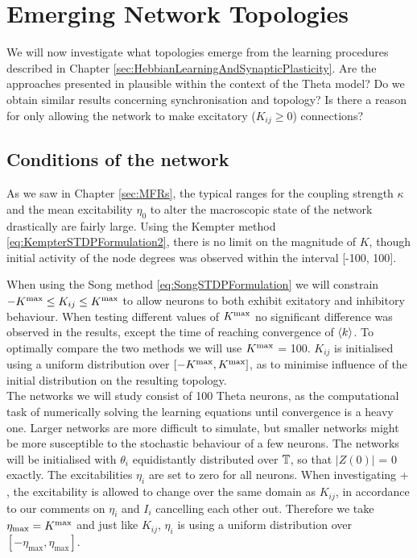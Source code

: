 \newpage
\section{\mywork Emerging Network Topologies}

We will now investigate what topologies emerge from the learning procedures described in Chapter \ref{sec:HebbianLearningAndSynapticPlasticity}. Are the approaches presented in \cite{Kempter1999, Song2000, Song2017, ChrolCannon2012} plausible within the context of the Theta model? Do we obtain similar results concerning synchronisation and topology? Is there a reason for only allowing the network to make excitatory ($K_{ij} \geq 0$) connections? 

\subsection{Conditions of the network}
As we saw in Chapter \ref{sec:MFRs}, the typical ranges for the coupling strength $\kappa$ and the mean excitability $\eta_0$ to alter the macroscopic state of the network drastically are fairly large. Using the Kempter method \eqref{eq:KempterSTDPFormulation2}, there is no limit on the magnitude of $K$, though initial activity of the node degrees was observed within the interval [-100, 100]. 

When using the Song method \eqref{eq:SongSTDPFormulation} we will constrain $-K^{\rm max} \leq K_{ij} \leq K^{\rm max}$ to allow neurons to both exhibit exitatory and inhibitory behaviour. When testing different values of $K^{\rm max}$ no significant difference was observed in the results, except the time of reaching convergence of ${\langle k\rangle}$. To optimally compare the two methods we will use $K^{\rm max}$ = 100. $K_{ij}$ is initialised using a uniform distribution over $[-K^{\rm max}, K^{\rm max}]$, as to minimise influence of the initial distribution on the resulting topology.\\

The networks we will study consist of 100 Theta neurons, as the computational task of numerically solving the learning equations until convergence is a heavy one. Larger networks are more difficult to simulate, but smaller networks might be more susceptible to the stochastic behaviour of a few neurons. The networks will be initialised with $\theta_i$ equidistantly distributed over ${\mathbb{T}}$, so that $| Z(0) |$ = 0 exactly. The excitabilities $\eta_i$ are set to zero for all neurons. 
When investigating \STDP + \IP, the excitability is allowed to change over the same domain as $K_{ij}$, in accordance to our comments on $\eta_i$ and $I_i$ cancelling each other out. Therefore we take $\eta_{\max} = K^{\rm max}$ and just like $K_{ij}$, $\eta_i$ is using a uniform distribution over $[-\eta_{\max}, \eta_{\max}]$.


